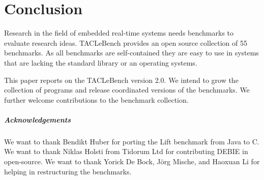 \documentclass[a4paper,UKenglish]{oasics}
\newcommand{\benchcount}{55 }
\begin{document}
\section{Conclusion}
\label{sec:conclusion}

Research in the field of embedded real-time systems needs benchmarks to
evaluate research ideas. TACLeBench provides an open source collection of
\benchcount benchmarks. As all benchmarks are self-contained they are easy to
use in systems that are lacking the standard library or an operating systems.

This paper reports on the TACLeBench version 2.0. We intend to grow the
collection of programs and release coordinated versions of the benchmarks.
We further welcome contributions to the benchmark collection.



\subparagraph*{Acknowledgements}

We want to thank Bendikt Huber for porting the Lift benchmark from Java to C.
We want to thank Niklas Holsti from Tidorum Ltd for contributing DEBIE in open-source.
We want to thank Yorick De Bock, J{\"o}rg Mische, and Haoxuan Li for helping in restructuring the benchmarks.



\end{document}
